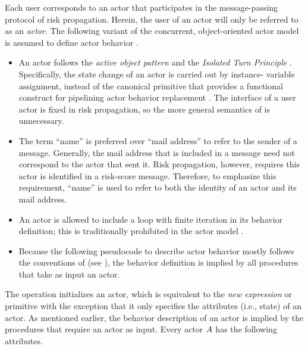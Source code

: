 Each user corresponds to an actor that participates in the message-passing protocol of risk propagation. Herein, the user of an actor will only be referred to as an \emph{actor}. The following variant of the concurrent, object-oriented actor model is assumed to define actor behavior \cite{Agha1985, Agha1990}.
%
\begin{itemize}
	\item An actor follows the \emph{active object pattern} \cite{Lavender1996, Koster2016} and the \emph{Isolated Turn Principle} \cite{Koster2016}. Specifically, the state change of an actor is carried out by instance- variable assignment, instead of the canonical \cBecome{} primitive that provides a functional construct for pipelining actor behavior replacement \cite{AghaThesis1985, Agha1985, Agha1990}. The interface of a user actor is fixed in risk propagation, so the more general semantics of \cBecome{} is unnecessary.
	\item The term ``name'' \cite{Hewitt1977, AghaThesis1985} is preferred over ``mail address'' \cite{AghaThesis1985, Agha1985, Agha1990} to refer to the sender of a message. Generally, the mail address that is included in a message need not correspond to the actor that sent it. Risk propagation, however, requires this actor is identified in a risk-score message. Therefore, to emphasize this requirement, ``name'' is used to refer to both the identity of an actor and its mail address.
	\item An actor is allowed to include a loop with finite iteration in its behavior definition; this is traditionally prohibited in the actor model \cite{AghaThesis1985, Agha1990}.
	\item Because the following pseudocode to describe actor behavior mostly follows the conventions of \cite{Cormen2022} (see ), the behavior definition is implied by all procedures that take as input an actor.
\end{itemize}
%
The \cCreateActor{} operation initializes an actor, which is equivalent to the \emph{new expression} \cite{AghaThesis1985} or \cCreate{} primitive \cite{Agha1985, Agha1990} with the exception that it only specifies the attributes (i.e., state) of an actor. As mentioned earlier, the behavior description of an actor is implied by the procedures that require an actor as input. Every actor $A$ has the following attributes.
%
